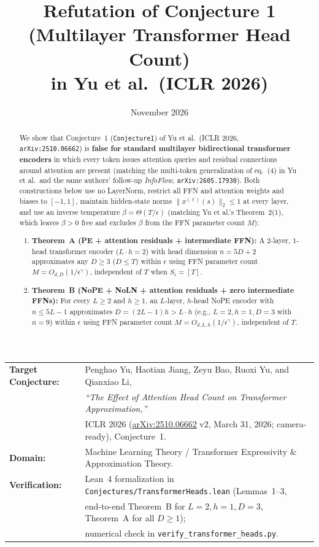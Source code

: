 \documentclass[11pt]{article}
\title{Refutation of Conjecture 1 (Multilayer Transformer Head Count)\\
in Yu et al.\ (ICLR 2026)}
\author{}
\date{November 2026}
\theoremstyle{plain}
\theoremstyle{definition}
\theoremstyle{remark}
\newcommand{\1}{\mathbf{1}}
\begin{document}
\maketitle

\begin{center}
\small
\begin{tabular}{@{}ll@{}}
\textbf{Target Conjecture:} & Penghao Yu, Haotian Jiang, Zeyu Bao, Ruoxi Yu, and Qianxiao Li, \\
& \emph{``The Effect of Attention Head Count on Transformer Approximation,''} \\
& ICLR 2026 (\href{https://arxiv.org/abs/2510.06662}{arXiv:2510.06662} v2, March 31, 2026; camera-ready), Conjecture~1. \\
\textbf{Domain:} & Machine Learning Theory / Transformer Expressivity \& Approximation Theory. \\
\textbf{Verification:} & Lean~4 formalization in \texttt{Conjectures/TransformerHeads.lean} (Lemmas~1--3, \\
& end-to-end Theorem~B for $L=2,h=1,D=3$, Theorem~A for all $D\ge 1$); \\
& numerical check in \texttt{verify\_transformer\_heads.py}.
\end{tabular}
\end{center}

\begin{abstract}
We show that Conjecture~1 (\texttt{Conjecture1}) of Yu et al.\ (ICLR 2026, \texttt{arXiv:2510.06662}) is \textbf{false for standard multilayer bidirectional transformer encoders} in which every token issues attention queries and residual connections around attention are present (matching the multi-token generalization of eq.~(4) in Yu et al.\ and the same authors' follow-up \emph{InfoFlow}, \texttt{arXiv:2605.17930}). Both constructions below use no LayerNorm, restrict all FFN and attention weights and biases to $[-1,1]$, maintain hidden-state norms $\|x^{(\ell)}(s)\|_2 \le 1$ at every layer, and use an inverse temperature $\beta = \Theta(T/\epsilon)$ (matching Yu et al.'s Theorem~2(1), which leaves $\beta > 0$ free and excludes $\beta$ from the FFN parameter count $M$):
\begin{enumerate}[leftmargin=2em,itemsep=2pt]
    \item \textbf{Theorem~A (PE + attention residuals + intermediate FFN):} A $2$-layer, $1$-head transformer encoder ($L \cdot h = 2$) with head dimension $n = 5D + 2$ approximates any $D \ge 3$ ($D \le T$) within $\epsilon$ using FFN parameter count $M = O_{d,D}(1/\epsilon^\gamma)$, independent of $T$ when $S_i = [T]$.
    \item \textbf{Theorem~B (NoPE + NoLN + attention residuals + zero intermediate FFNs):} For every $L \ge 2$ and $h \ge 1$, an $L$-layer, $h$-head NoPE encoder with $n \le 5L - 1$ approximates $D = (2L - 1)h > L \cdot h$ (e.g., $L = 2, h = 1, D = 3$ with $n = 9$) within $\epsilon$ using FFN parameter count $M = O_{d,L,h}(1/\epsilon^\gamma)$, independent of $T$.
\end{enumerate}
\end{abstract}
\end{document}
